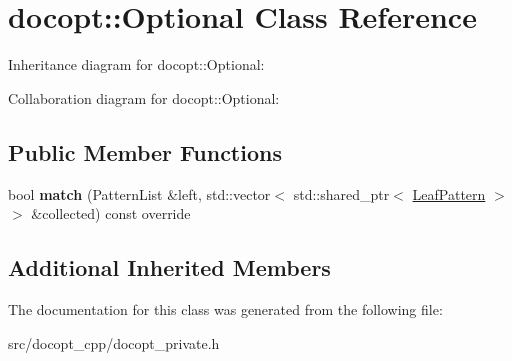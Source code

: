 \hypertarget{classdocopt_1_1Optional}{}\section{docopt\+:\+:Optional Class Reference}
\label{classdocopt_1_1Optional}


Inheritance diagram for docopt\+:\+:Optional\+:


Collaboration diagram for docopt\+:\+:Optional\+:
\subsection*{Public Member Functions}
\begin{DoxyCompactItemize}
\item 
\mbox{\label{classdocopt_1_1Optional_a64812d6b139119fb065b740099d7448d}} 
bool {\bfseries match} (Pattern\+List \&left, std\+::vector$<$ std\+::shared\+\_\+ptr$<$ \hyperlink{classdocopt_1_1LeafPattern}{Leaf\+Pattern} $>$$>$ \&collected) const override
\end{DoxyCompactItemize}
\subsection*{Additional Inherited Members}


The documentation for this class was generated from the following file\+:\begin{DoxyCompactItemize}
\item 
src/docopt\+\_\+cpp/docopt\+\_\+private.\+h\end{DoxyCompactItemize}
